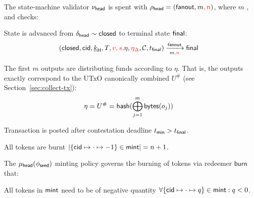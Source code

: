 \noindent The state-machine validator $\nu_\mathsf{head}$ is spent with
$\rho_{\mathsf{head}} = (\mathsf{fanout}, m\textcolor{red}{, n})$, where $m$ , and checks:
\begin{menumerate}
	\item State is advanced from $\delta_{\mathsf{head}} \sim \mathsf{closed}$ to terminal state
	$\mathsf{final}$: %
	\[
		(\mathsf{closed},\mathsf{cid},\underline{k}_{\mathsf{H}},T,\textcolor{red}{v, s,}\eta,\textcolor{red}{\eta_{\Delta}},\mathcal{C},t_{\mathsf{final}}) \xrightarrow[m\textcolor{red}{,n}]{\mathsf{fanout}} \mathsf{final}
	\]
	\item The first $m$ outputs are distributing funds according to $\eta$. That is,
	the outputs exactly correspond to the UTxO canonically combined $U^{\#}$ (see
	Section~\ref{sec:collect-tx}):
	\[
		\eta = U^{\#} = \mathsf{hash}(\bigoplus_{j=1}^{m} \mathsf{bytes}(o_{j}))
	\]
	\item Transaction is posted after contestation deadline $t_{\mathsf{min}} > t_{\mathsf{final}}$.
	\item All tokens are burnt
	$|\{\mathsf{cid} \mapsto \cdot \mapsto -1\} \in \mathsf{mint}| = n + 1$.
\end{menumerate}

\noindent The $\mu_\mathsf{head}(\phi_{\mathsf{seed}})$ minting policy governs the burning of tokens via
redeemer $\mathsf{burn}$ that:
\begin{menumerate}
	\item All tokens in $\mathsf{mint}$ need to be of negative quantity
	$\forall \{\mathsf{cid} \mapsto \cdot \mapsto q\} \in \mathsf{mint} : q < 0$.
\end{menumerate}

\FloatBarrier{}

